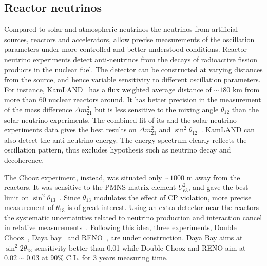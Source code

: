 \subsection{Reactor neutrinos}
\label{sec:reactor}
Compared to solar and atmospheric neutrinos the neutrinos from artificial sources, reactors and accelerators, allow precise measurements of the oscillation parameters under more controlled and better understood conditions. Reactor neutrino experiments detect anti-neutrinos from the decays of radioactive fission products in the nuclear fuel. The detector can be constructed at varying distances from the source, and hence variable sensitivity to different oscillation parameters. For instance, KamLAND~\cite{Kam03} has a flux weighted average distance of $\sim180$ km from more than 60 nuclear reactors around. It has better precision in the measurement of the mass difference $\Delta m^{2}_{21}$ but is less sensitive to the mixing angle $\theta_{12}$ than the solar neutrino experiments. The combined fit of its and the solar neutrino experiments data gives the best results on $\Delta m^{2}_{21}$ and $\sin^{2}\theta_{12}$~\cite{Kam08}. KamLAND can also detect the anti-neutrino energy. The energy spectrum clearly reflects the oscillation pattern, thus excludes hypothesis such as neutrino decay and decoherence.

The Chooz experiment, instead, was situated only $\sim1000$ m away from the reactors. It was sensitive to the PMNS matrix element $U_{e3}^{2}$, and gave the best limit on $\sin^{2}\theta_{13}$~\cite{Cho03}. Since $\theta_{13}$ modulates the effect of CP violation, more precise measurement of $\theta_{13}$ is of great interest. Using an extra detector near the reactors the systematic uncertainties related to neutrino production and interaction cancel in relative measurements~\cite{Koz03}. Following this idea, three experiments, Double Chooz~\cite{Dbc06}, Daya bay~\cite{Day07} and RENO~\cite{Ren08}, are under construction. Daya Bay aims at $\sin^{2}2\theta_{13}$ sensitivity better than 0.01 while Double Chooz and RENO aim at $0.02 \sim 0.03$ at $90\%$ C.L. for 3 years measuring time.

